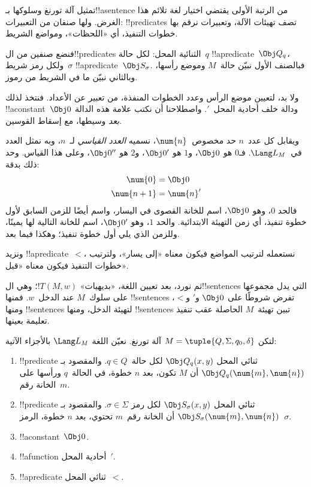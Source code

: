 \documentclass[../../../include/open-logic-section]{subfiles}
\begin{document}

\begin{explain}
تمثيل آلة تورنغ وسلوكها بـ!!a{sentence} من الرتبة الأولى يقتضي
اختيار لغة تلائم هذا الغرض. ولها صنفان من التعبيرات:
!!{predicate}s تصف تهيئات الآلة، وتعبيرات نرقم بها خطوات التنفيذ،
أي «اللحظات»، ومواضع الشريط.

فنضع صنفين من ال!!{predicate}s الثنائية المحل: لكل حالة~$q$
!!a{predicate}~$\Obj Q_q$، ولكل رمز شريط~$\sigma$
!!a{predicate}~$\Obj S_\sigma$. فبالصنف الأول نبيّن حالة~$M$
وموضع رأسها، وبالثاني نبيّن ما في الشريط من رموز.

ولا بد، لتعيين موضع الرأس وعدد الخطوات المنفذة، من تعبير عن
الأعداد. فنتخذ لذلك !!a{constant}~$\Obj 0$ ودالة خلف أحادية
المحل~$\prime$. واصطلاحنا أن نكتب علامة هذه الدالة \emph{بعد}
وسيطها، مع إسقاط القوسين.

ويقابل كل عدد~$n$ حد مخصوص~$\num{n}$، نسميه
\emph{العدد القياسي} لـ~$n$، وبه نمثل العدد في~$\Lang L_M$.
فـ$\num{0}$ هو $\Obj 0$، و$\num{1}$ هو $\Obj 0'$،
و$\num{2}$ هو $\Obj 0''$، وعلى هذا القياس. وحد ذلك بدقة:
\begin{align*}
\num{0} & = \Obj 0 \\
\num{n+1} &= \num{n}'
\end{align*}
فالحد $\num{0}$، وهو $\Obj 0$، اسم للخانة القصوى في اليسار،
واسم أيضًا للزمن السابق لأول خطوة تنفيذ، أي زمن التهيئة الابتدائية.
والحد $\num{1}$، وهو $\Obj 0'$، اسم للخانة التالية لها يمينًا،
وللزمن الذي يلي أول خطوة تنفيذ؛ وهكذا فيما بعد.

ونزيد !!a{predicate}~$<$، نستعمله لترتيب المواضع فيكون معناه
«إلى يسار»، ولترتيب خطوات التنفيذ فيكون معناه «قبل».

ثم نورد، بعد تعيين اللغة، «بديهيات» $!T(M,w)$؛ وهي
ال!!{sentence}s التي يدل مجموعها على سلوك~$M$ عند الدخل~$w$.
فمنها !!{sentence}s تفرض شروطًا على $\Obj 0$ و$\prime$ و$<$،
ومنها !!{sentence}s لتهيئة الدخل، ومنها !!{sentence}s تبين
تهيئة~$M$ الحاصلة عقب تنفيذ تعليمة بعينها.
\end{explain}

\begin{defn}
لتكن $M=\tuple{Q,\Sigma,q_0,\delta}$ آلة تورنغ. نعيّن اللغة
$\Lang L_M$ بالأجزاء الآتية:
\begin{enumerate}
\item !!{predicate} ثنائي المحل $ \Obj Q_q(x,y)$ لكل حالة~$q\in Q$.
  والمقصود بـ$\Obj Q_q(\num{m},\num{n})$ أن $M$ تكون، بعد $n$
  خطوة، في الحالة~$q$ ورأسها على الخانة رقم~$m$.
\item !!{predicate} ثنائي المحل $\Obj S_\sigma(x,y)$ لكل رمز
  $\sigma\in\Sigma$. والمقصود بـ$\Obj S_\sigma(\num{m},\num{n})$
  أن الخانة رقم~$m$ تحتوي، بعد $n$ خطوة، الرمز~$\sigma$.
\item !!a{constant}~$\Obj 0$.
\item !!a{function} أحادية المحل~$\prime$.
\item !!a{predicate} ثنائي المحل~$<$.
\end{enumerate}
\end{defn}
\end{document}
